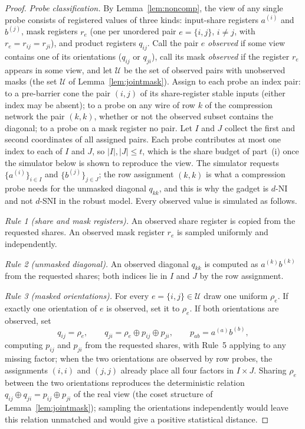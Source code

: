 \documentclass[lettersize,journal]{IEEEtran}
\newcommand{\share}[2]{#1^{(#2)}}
\begin{document}
\begin{proof}
\emph{Probe classification.} By Lemma~\ref{lem:noncomp}, the view of any
single probe consists of registered values of three kinds: input-share
registers $\share{a}{i}$ and $\share{b}{j}$, mask registers $r_e$ (one per
unordered pair $e=\{i,j\}$, $i\ne j$, with $r_e=r_{ij}=r_{ji}$), and
product registers $q_{ij}$. Call the pair $e$ \emph{observed} if some view
contains one of its orientations ($q_{ij}$ or $q_{ji}$), call its mask
\emph{observed} if the register $r_e$ appears in some view, and let
$\mathcal{U}$ be the set of observed pairs with unobserved masks (the set
$\mathcal{U}$ of Lemma~\ref{lem:jointmask}). Assign to each probe an index
pair: to a pre-barrier cone the pair $(i,j)$ of its share-register stable
inputs (either index may be absent); to a probe on any wire of row $k$ of
the compression network the pair $(k,k)$, whether or not the observed
subset contains the diagonal; to a probe on a mask register no pair. Let
$I$ and $J$ collect the first and second coordinates of all assigned
pairs. Each probe contributes at most one index to each of $I$ and $J$, so
$|I|,|J|\le t$, which is the share budget of part~(i) once the simulator
below is shown to reproduce the view. The simulator requests
$\{\share{a}{i}\}_{i\in I}$ and $\{\share{b}{j}\}_{j\in J}$; the row
assignment $(k,k)$ is what a compression probe needs for the unmasked
diagonal $q_{kk}$, and this is why the gadget is $d$-NI and not $d$-SNI in
the robust model. Every observed value is simulated as follows.

\emph{Rule 1 (share and mask registers).} An observed share register is
copied from the requested shares. An observed mask register $r_e$ is
sampled uniformly and independently.

\emph{Rule 2 (unmasked diagonal).} An observed diagonal $q_{kk}$ is
computed as $\share{a}{k}\share{b}{k}$ from the requested shares; both
indices lie in $I$ and $J$ by the row assignment.

\emph{Rule 3 (masked orientations).} For every $e=\{i,j\}\in\mathcal{U}$
draw one uniform $\rho_e$. If exactly one orientation of $e$ is observed,
set it to $\rho_e$. If both orientations are observed, set
\[
q_{ij}=\rho_e,\qquad
q_{ji}=\rho_e\oplus p_{ij}\oplus p_{ji},
\qquad p_{ab}=\share{a}{a}\share{b}{b},
\]
computing $p_{ij}$ and $p_{ji}$ from the requested shares, with Rule~5
applying to any missing factor; when the two orientations are observed by
row probes, the assignments $(i,i)$ and $(j,j)$ already place all four
factors in $I\times J$. Sharing $\rho_e$ between the two orientations
reproduces the deterministic relation
$q_{ij}\oplus q_{ji}=p_{ij}\oplus p_{ji}$ of the real view (the coset
structure of Lemma~\ref{lem:jointmask}); sampling the orientations
independently would leave this relation unmatched and would give a
positive statistical distance.


\end{proof}
\end{document}
